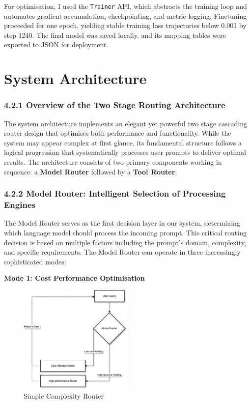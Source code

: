 For optimisation, I used the \texttt{Trainer} API, which abstracts the training loop and automates gradient accumulation, checkpointing, and metric logging. Finetuning proceeded for one epoch, yielding stable training loss trajectories below 0.001 by step 1240. The final model was saved locally, and its mapping tables were exported to JSON for deployment.


\section{System Architecture}
\subsubsection{4.2.1 Overview of the Two Stage Routing Architecture}

The system architecture implements an elegant yet powerful two stage cascading router design that optimises both performance and functionality. While the system may appear complex at first glance, its fundamental structure follows a logical progression that systematically processes user prompts to deliver optimal results. The architecture consists of two primary components working in sequence: a \textbf{Model Router} followed by a \textbf{Tool Router}.

\subsubsection{4.2.2 Model Router: Intelligent Selection of Processing Engines}

The Model Router serves as the first decision layer in our system, determining which language model should process the incoming prompt. This critical routing decision is based on multiple factors including the prompt's domain, complexity, and specific requirements. The Model Router can operate in three increasingly sophisticated modes:

\textbf{Mode 1: Cost Performance Optimisation}  


\begin{figure}[H]
    \centering
    \includegraphics[width=0.5\textwidth]{figures/model-compx-router.drawio.png}
    \caption{Simple Complexity Router}
    \label{fig:simple_complexity_router}
\end{figure}


